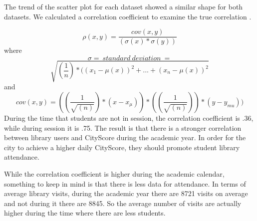 \documentclass[journal, a4paper]{IEEEtran}
\begin{document}
\newline 
\newline 
The trend of the scatter plot for each dataset showed a similar shape for both datasets. We calculated a correlation coefficient to examine the true correlation \cite{brookegh}.
\newline

$$\rho(x,y) = \frac{cov(x,y)}{(\sigma(x) * \sigma (y))}$$
where
$$\sigma = \ standard \  deviation\ = $$  
$$\sqrt{(\frac{1}{n})*((x_{1} - \mu(x))^{2}+...+(x_{n} - \mu(x))^{2}}$$
and
$$cov(x,y) = ((\frac{1}{\sqrt{(n)}})*(x-x_{\mu})) * ((\frac{1}{\sqrt{(n)}})) * (y-y_{mu}))$$
\newline
During the time that students are not in session, the correlation coefficient is .36, while during session it is .75. The result is that there is a stronger correlation between library users and CityScore during the academic year. In order for the city to achieve a higher daily CityScore, they should promote student library attendance.
\newline
\tab

While the correlation coefficient is higher during the academic calendar, something to keep in mind is that there is less data for attendance. In terms of average library visits, during the academic year there are 8721 visits on average and not during it there are 8845. So the average number of visits are actually higher during the time where there are less students.
 
\newline
\end{document}
